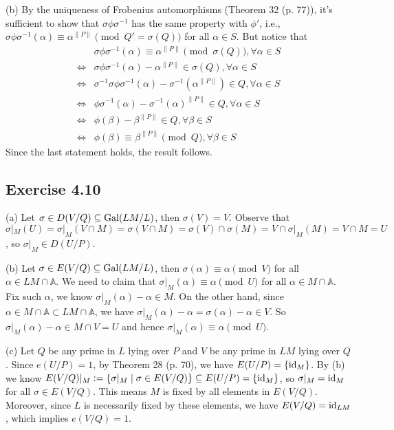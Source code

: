 \documentclass[../Marcus.tex]{subfiles}
\begin{document}
(b) By the uniqueness of Frobenius automorphisms (Theorem 32 (p. 77)), it's sufficient to show that $\sigma\phi\sigma^{-1}$ has the same property with $\phi'$, i.e., $\sigma\phi\sigma^{-1}(\alpha)\equiv\alpha^{\|P\|} \pmod{Q'=\sigma(Q)}$ for all $\alpha\in S$. But notice that
\begin{align*}
    &\sigma\phi\sigma^{-1}(\alpha)\equiv\alpha^{\|P\|} \pmod{\sigma(Q)}, \forall\alpha\in S \\
    \iff{} &\sigma\phi\sigma^{-1}(\alpha)-\alpha^{\|P\|}\in\sigma(Q), \forall\alpha\in S \\
    \iff{} &\sigma^{-1}\sigma\phi\sigma^{-1}(\alpha)-\sigma^{-1}(\alpha^{\|P\|}) \in Q, \forall\alpha\in S \\
    \iff{} &\phi\sigma^{-1}(\alpha)-\sigma^{-1}(\alpha)^{\|P\|} \in Q, \forall\alpha\in S \\
    \iff{} &\phi(\beta)-\beta^{\|P\|} \in Q, \forall\beta\in S \\
    \iff{} &\phi(\beta)\equiv\beta^{\|P\|} \pmod{Q}, \forall\beta\in S
\end{align*}
Since the last statement holds, the result follows.

\subsection*{Exercise 4.10}

(a) Let $\sigma\in D(V/Q)\subseteq\operatorname{Gal}(LM/L)$, then $\sigma(V)=V$. Observe that $\sigma|_M(U)=\sigma|_M(V\cap M)=\sigma(V\cap M)=\sigma(V)\cap\sigma(M)=V\cap\sigma|_M(M)=V\cap M=U$, so $\sigma|_M\in D(U/P)$.

(b) Let $\sigma\in E(V/Q)\subseteq\operatorname{Gal}(LM/L)$, then $\sigma(\alpha)\equiv\alpha \pmod{V}$ for all $\alpha\in LM\cap\mathbb{A}$. We need to claim that $\sigma|_M(\alpha)\equiv\alpha\pmod{U}$ for all $\alpha\in M\cap\mathbb{A}$. Fix such $\alpha$, we know $\sigma|_M(\alpha)-\alpha\in M$. On the other hand, since $\alpha\in M\cap\mathbb{A}\subset LM\cap\mathbb{A}$, we have $\sigma|_M(\alpha)-\alpha=\sigma(\alpha)-\alpha\in V$. So $\sigma|_M(\alpha)-\alpha\in M\cap V=U$ and hence $\sigma|_M(\alpha)\equiv\alpha\pmod{U}$.

(c) Let $Q$ be any prime in $L$ lying over $P$ and $V$ be any prime in $LM$ lying over $Q$. Since $e(U/P)=1$, by Theorem 28 (p. 70), we have $E(U/P)=\{\operatorname{id}_M\}$. By (b) we know $E(V/Q)|_M:=\{\sigma|_M \mid \sigma\in E(V/Q)\} \subseteq E(U/P)=\{\operatorname{id}_M\}$, so $\sigma|_M=\operatorname{id}_M$ for all $\sigma\in E(V/Q)$. This means $M$ is fixed by all elements in $E(V/Q)$. Moreover, since $L$ is necessarily fixed by these elements, we have $E(V/Q)=\operatorname{id}_{LM}$, which implies $e(V/Q)=1$.
\end{document}
